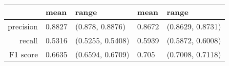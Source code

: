 \begin{table}[ht]
\centering
\begin{tabular}{rllll}
  \hline
 & mean & range & mean & range \\ 
  \hline
precision & 0.8827 & (0.878, 0.8876) & 0.8672 & (0.8629, 0.8731) \\ 
  recall & 0.5316 & (0.5255, 0.5408) & 0.5939 & (0.5872, 0.6008) \\ 
  F1 score & 0.6635 & (0.6594, 0.6709) & 0.705 & (0.7008, 0.7118) \\ 
   \hline
\end{tabular}
\end{table}
